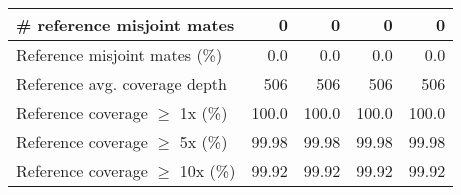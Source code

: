 \documentclass[12pt,a4paper]{article}
\begin{document}
\begin{table}[ht]
\begin{center}
\begin{tabular}{|l*{4}{|r}|}
\# reference misjoint mates & 0 & 0 & 0 & 0 \\ \hline
Reference misjoint mates (\%) & 0.0 & 0.0 & 0.0 & 0.0 \\ \hline
Reference avg. coverage depth & 506 & 506 & 506 & 506 \\ \hline
Reference coverage $\geq$ 1x (\%) & 100.0 & 100.0 & 100.0 & 100.0 \\ \hline
Reference coverage $\geq$ 5x (\%) & 99.98 & 99.98 & 99.98 & 99.98 \\ \hline
Reference coverage $\geq$ 10x (\%) & 99.92 & 99.92 & 99.92 & 99.92 \\ \hline
\end{tabular}
\end{center}
\end{table}
\end{document}
